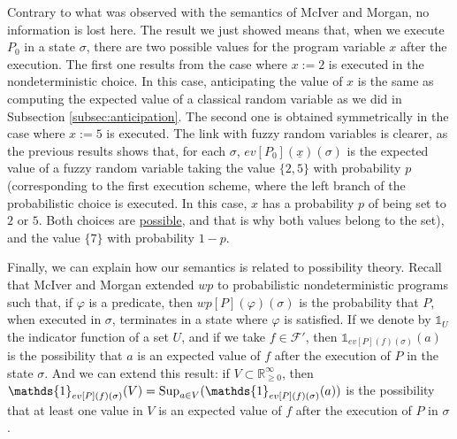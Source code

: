 \documentclass[a4paper,10pt]{llncs}
\def\RRposi {{\mathbb R_{\geq 0}^{\infty}}}
\def\Sup {\textnormal {Sup}}
\begin{document}
Contrary to what was observed with the semantics of McIver and Morgan, no information is lost here.
The result we just showed means that, when we execute $P_0$ in a state $\sigma$, there are two possible values for the program variable $x$ after the execution. The first one results from the case where $x := 2$ is executed in the nondeterministic choice. In this case, anticipating the value of $x$ is the same as computing the expected value of a classical random variable as we did in Subsection \ref{subsec:anticipation}. The second one is obtained symmetrically in the case where $x := 5$ is executed.\newline
The link with fuzzy random variables is clearer, as the previous results shows that, for each $\sigma$, $ev[P_0](\underline{x})(\sigma)$ is the expected value of a fuzzy random variable taking the value $\{2,5\}$ with probability $p$ (corresponding to the first execution scheme, where the left branch of the probabilistic choice is executed. In this case, $x$ has a probability $p$ of being set to $2$ or $5$. Both choices are \underline{possible}, and that is why both values belong to the set), and the value $\{7\}$ with probability $1-p$.
\bigskip

Finally, we can explain how our semantics is related to possibility theory. Recall that McIver and Morgan extended $wp$ to probabilistic nondeterministic programs such that, if $\varphi$ is a predicate, then $wp[P](\varphi)(\sigma)$ is the probability that $P$, when executed in $\sigma$, terminates in a state where $\varphi$ is satisfied.\newline
If we denote by $\mathds{1}_U$ the indicator function of a set $U$, and if we take $f \in \mathcal{F}'$, then $\mathds{1}_{ev[P](f)(\sigma)}(a)$ is the possibility that $a$ is an expected value of $f$ after the execution of $P$ in the state $\sigma$. And we can extend this result: if $V \subset \RRposi$, then $\mathds{1}_{ev[P](f)(\sigma)}(V) = \Sup_{a \in V}(\mathds{1}_{ev[P](f)(\sigma)}(a))$ is the possibility that at least one value in $V$ is an expected value of $f$ after the execution of $P$ in $\sigma$.
\end{document}

